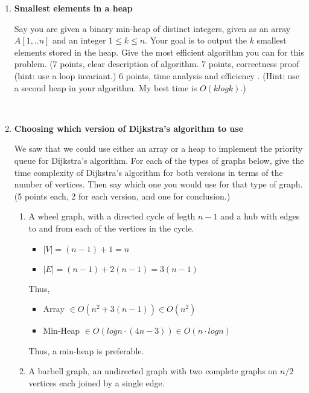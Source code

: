 \documentclass[12pt, letterpaper]{article}
\begin{document}
\begin{enumerate}
\-\ \newpage
\item \textbf{Smallest elements in a heap}

Say you are given a binary min-heap of distinct integers, given as an array $A[1,..n]$ and
an integer $1 \le k \le n$.  Your goal is to output the $k$ smallest elements stored in the heap.  Give the most efficient algorithm you can for this problem.
(7 points, clear description of algorithm.  7 points, correctness proof (hint: use a loop invariant.)  6 points, time analysis and efficiency .  (Hint: use a second heap in your algorithm.  My best time is $O(k log k)$.)


\-\ \newpage
\item \textbf{Choosing which version of Dijkstra's algorithm to use}

We saw that we could use either an array or a heap to implement the priority queue for Dijkstra's
algorithm.  For each of the types of graphs below, give the time complexity of Dijkstra's algorithm for both versions in terms of the number of vertices.  Then say which one you would use for that type of graph.  
(5 points each, 2 for each version, and one for conclusion.)

\begin{enumerate}
\item A wheel graph, with a directed cycle of legth $n-1$ and a hub with edges
to and from each of the vertices in the cycle.

\begin{itemize}
    \item \(|V| = (n-1) + 1 = n\)
    \item \(|E| = (n-1) + 2(n-1) = 3(n-1) \)
\end{itemize}

Thus,
\begin{itemize}
    \item Array \(\in O(n^2 + 3(n-1)) \in O(n^2)\)
    \item Min-Heap \(\in O(logn\cdot(4n-3)) \in O(n\cdot logn)\)
\end{itemize}

Thus, a min-heap is preferable. \newline

\item A barbell graph, an undirected graph with two complete graphs on $n/2$ vertices each joined by a single edge.


\end{enumerate}
\end{enumerate}
\end{document}
